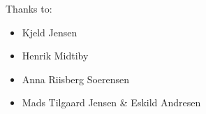 Thanks to: 
\begin{itemize}
	\item Kjeld Jensen
	\item Henrik Midtiby 
	\item Anna Riisberg Soerensen
	\item Mads Tilgaard Jensen \& Eskild Andresen 
\end{itemize}